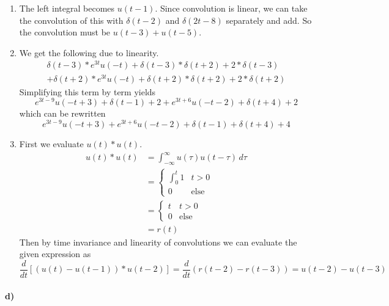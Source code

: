 \documentclass[12pt]{article}
\begin{document}
\begin{enumerate}
    \item The left integral becomes \(u(t-1)\). Since convolution is linear, we can take the convolution of this with \(\delta(t-2)\) and \(\delta(2t-8)\) separately and add.
    So the convolution must be \(u(t-3)+u(t-5)\).
    \item We get the following due to linearity.
    \begin{multline*}
        \delta(t-3)*e^{3t}u(-t) + \delta(t-3)*\delta(t+2) + 2*\delta(t-3)\\
        + \delta(t+2)*e^{3t}u(-t) + \delta(t+2)*\delta(t+2) + 2*\delta(t+2)
    \end{multline*}
    Simplifying this term by term yields
    \[e^{3t-9}u(-t+3) + \delta(t-1) + 2 + e^{3t+6}u(-t-2) + \delta(t+4) + 2\]
    which can be rewritten
    \[e^{3t-9}u(-t+3) + e^{3t+6}u(-t-2) + \delta(t-1) + \delta(t+4) + 4\]
    \item First we evaluate \(u(t)*u(t)\).
    \begin{align*}
        u(t)*u(t)&=\int_{-\infty}^\infty u(\tau)u(t-\tau)\, d\tau\\
        &=\begin{cases}
            \int_0^t 1 & t>0\\
            0 & \text{else}
        \end{cases}\\
        &=\begin{cases}
            t & t>0\\
            0 & \text{else}
        \end{cases}\\
        &=r(t)
    \end{align*}
    Then by time invariance and linearity of convolutions we can evaluate the given expression as
    \[\frac{d}{dt}[(u(t)-u(t-1))*u(t-2)]=\frac{d}{dt}(r(t-2)-r(t-3))=u(t-2)-u(t-3)\]
\end{enumerate}

\paragraph{d)}
\end{document}
